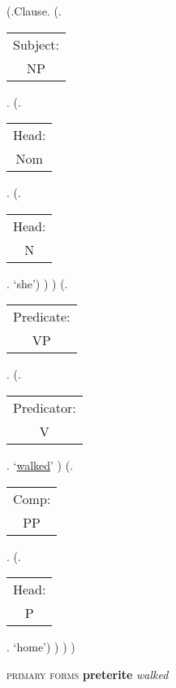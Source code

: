 \documentclass[12pt,letterpaper]{article}
\begin{document}
		\begin{figure}
	\begin{center}
		\begin{parsetree}
			(.Clause.
			(.\begin{tabular}{c}Subject:\\NP\end{tabular}.  
			(.\begin{tabular}{c}Head:\\Nom\end{tabular}.
			(.\begin{tabular}{c}Head:\\N\end{tabular}. `she')
			)
			)
			(.\begin{tabular}{c}Predicate:\\VP\end{tabular}.
			(.\begin{tabular}{c}Predicator:\\V\end{tabular}.    `\underline{walked}' )
			(.\begin{tabular}{c}Comp:\\PP\end{tabular}. 
			(.\begin{tabular}{c}Head:\\P\end{tabular}. `home')
			)
			)
			)
			
		\end{parsetree}
		\hfill \break \hfill {} \textsc{primary forms} \textbf{preterite} \textit{walked}
	\end{center}
\end{figure}
\end{document}
